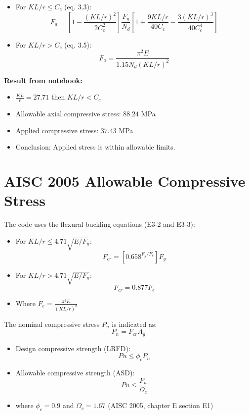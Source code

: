 \documentclass[12pt]{article}
\begin{document}
\begin{itemize}
    \item For $KL/r \leq C_c$ (eq. 3.3):
    \begin{equation*}
        F_a = \left[1 - \frac{(KL/r)^2}{2C_c^2}\right] \frac{F_y}{N_d} \left[1 + \frac{9 KL/r}{40 C_c} - \frac{3 (KL/r)^3}{40 C_c^4}\right] 
    \end{equation*}
    \item For $KL/r > C_c$ (eq. 3.5):
    \begin{equation*}
        F_a = \frac{\pi^2 E}{1.15 N_d (KL/r)^2} 
    \end{equation*}
\end{itemize}

\noindent \textbf{Result from notebook:}
\begin{itemize}
    \item $\frac{KL}{r} = 27.71$ then $KL/r < C_c$ 
    \item Allowable axial compressive stress: $88.24$ MPa 
    \item Applied compressive stress: $37.43$ MPa
    \item Conclusion: Applied stress is within allowable limits.
\end{itemize}

\section{AISC 2005 Allowable Compressive Stress}
The code uses the flexural buckling equations (E3-2 and E3-3):

\begin{itemize}
    \item For $KL/r \leq 4.71\sqrt{E/F_y}$:
    \begin{equation*}
        F_{cr} = [0.658^{F_y/F_e}] F_y
    \end{equation*}
    \item For $KL/r > 4.71\sqrt{E/F_y}$:
    \begin{equation*}
        F_{cr} = 0.877 F_e
    \end{equation*}
    \item Where $F_e = \frac{\pi^2 E}{(KL/r)^2}$
\end{itemize}

\noindent The nominal compressive stress $P_{n}$ is indicated as:
\[
P_{n} = F_{cr} A_{g}
\]
\begin{itemize}
    \item Design compressive strength (LRFD): 
    \begin{equation*}
        P{u} \le \phi_{c} P_{n}
    \end{equation*}
    \item Allowable compressive strength (ASD):
    \begin{equation*}
        P{u} \le \frac{P_{n}}{\Omega_{c}}
    \end{equation*}
    \item where $\phi_{c} = 0.9$ and $\Omega_{c} = 1.67$ (AISC 2005, chapter E section E1)
\end{itemize}
\end{document}
